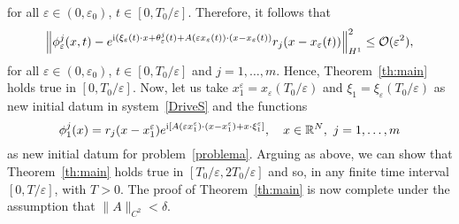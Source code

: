 \documentclass[11pt]{amsart}
\numberwithin{equation}{section}
\theoremstyle{definition}
\begin{document}
for all ${\varepsilon}\in(0,{\varepsilon}_{0})$, $t\in [0,T_0/{\varepsilon}]$.
Therefore, it follows that
\begin{equation}
\Big\|\phi_{\varepsilon}^j(x,t) -e^{{{\rm i}}(\xi_{\varepsilon}(t)\cdot
x+\theta^j_{\varepsilon}(t)+A({\varepsilon} x_{\varepsilon}(t)) \cdot
(x-x_{\varepsilon}(t))}r_j(x-x_{\varepsilon}(t))\Big\|_{H^1}^2\leq
\mathcal O({\varepsilon}^2),
\end{equation}
for all ${\varepsilon}\in(0,{\varepsilon}_{0})$, $t\in [0,T_0/{\varepsilon}]$ and $j=1, \dots, m$.
Hence, Theorem~\ref{th:main} holds true in $[0,T_0/{\varepsilon}]$.
Now, let us take $x_1^{\varepsilon}=x_{\varepsilon}(T_0/{\varepsilon})$ and $\xi_1=\xi_{\varepsilon}(T_0/{\varepsilon})$ as new initial
datum in system~\eqref{DriveS} and the functions
$$
\phi_1^j(x)=r_j(x-x_1^{\varepsilon})
e^{{{\rm i}}[A({\varepsilon} x_1^{\varepsilon})\cdot(x-x_1^{\varepsilon})+x\cdot\xi_1^{\varepsilon}]},\quad
x\in{{\mathbb R}}^N,\,\, j=1,\dots,m
$$ as new initial datum for problem~\eqref{problema}. Arguing as above, we can show that
Theorem~\ref{th:main} holds true in $[T_0/{\varepsilon}, 2T_0/{\varepsilon}]$ and so, in any
finite time interval $[0,T/{\varepsilon}]$, with $T>0$. The proof of Theorem~\ref{th:main} is now complete
under the assumption that $\|A\|_{C^2}<\delta$.
\end{document}
